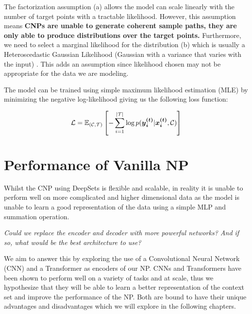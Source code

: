 \documentclass[../../main.tex]{subfiles}
\begin{document}
The  factorization assumption (a) allows the model can scale linearly with the number of target points with a tractable likelihood. However, this assumption means
\textbf{CNPs are unable to generate coherent sample paths, they are only able to produce distributions over the target points.} Furthermore, we need to select a marginal likelihood for the distribution (b) which is usually a Heteroscedastic Gaussian Likelihood (Gaussian with a variance that varies with the input) \cite{garnelo2018conditional}. This adds an assumption since likelihood chosen may not be appropriate for the data we are modeling.

The model can be trained using simple maximum likelihood estimation (MLE) by minimizing the negative log-likelihood giving us the following loss function:

\begin{equation}
    \mathcal{L} = \mathbb{E}_{(\mathcal{C}, \mathcal{T})} \left[- \sum_{i=1}^{|\mathcal{T}|} \log p(\bm{{y}_i^{(t)}} | \bm{{x}_i^{(t)}}, \mathcal{C})\right]
\end{equation}




\section{Performance of Vanilla NP}

Whilst the CNP using DeepSets is flexible and scalable, in reality it is unable to perform well on more complicated and higher dimensional data as the model is unable to learn a good representation of the data using a simple MLP and summation operation. 

\emph{Could we replace the encoder and decoder with more powerful networks? And if so, what would be the best architecture to use?} 

We aim to answer this by exploring the use of a Convolutional Neural Network (CNN) and a Transformer as encoders of our NP. CNNs and Transformers have been shown to perform well on a variety of tasks and at scale, thus we hypothesize that they will be able to learn a better representation of the context set and improve the performance of the NP.
Both are bound to have their unique advantages and disadvantages which we will explore in the following chapters.



\end{document}
